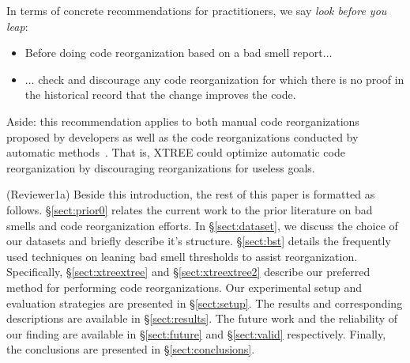 \documentclass[twocolumn,5p]{elsarticle}
\newcommand{\bi}{\begin{itemize}[leftmargin=0.4cm]}
\newcommand{\ei}{\end{itemize}}
\newcommand{\tion}[1]{\S\ref{sect:#1}}
\theoremstyle{break}
\begin{document}
	In terms of concrete recommendations for
		practitioners, we say {\em look before you leap}:
		\bi
		\item Before doing  code reorganization based on a bad smell 
		report$\ldots$ 
		\item $\ldots$ check and discourage any code reorganization   for which 
		there 
		is no proof
		in the historical record that the change improves the code.
		\ei
		Aside: this recommendation   applies to both manual code 
		reorganizations proposed by developers
		as well as the code reorganizations conducted by automatic 
		methods~\cite{mkaouer2015many}. That is, XTREE could optimize automatic
		code reorganization by discouraging reorganizations for useless goals.
	
	{\color{steel2} (Reviewer1a)
	Beside this introduction, the rest of this paper is formatted as follows. 
	\tion{prior0} relates the current work to the prior literature on bad 
	smells and code reorganization efforts. In \tion{dataset}, we 
	discuss the choice 
	of our datasets and briefly describe it's structure. \tion{bst} details the 
	frequently used techniques on leaning bad smell thresholds to assist 
	reorganization. Specifically, 
	\tion{xtreextree} and \tion{xtreextree2} describe our preferred method for 
	performing code reorganizations. Our experimental setup and evaluation 
	strategies are presented in \tion{setup}. The results and corresponding 
	descriptions are available in \tion{results}. The future work and the 
	reliability of our finding are available in \tion{future} and \tion{valid} 
	respectively. Finally, the conclusions are presented in \tion{conclusions}. 
}
		
	
	
\end{document}
